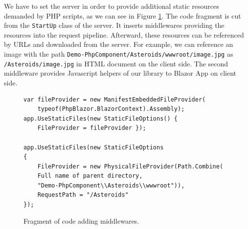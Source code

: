 We have to set the server in order to provide additional static resources demanded by PHP scripts, as we can see in Figure \ref{img19:settings}.
The code fragment is cut from the \texttt{StartUp} class of the server.
It inserts middlewares providing the resources into the request pipeline.
Afterward, these resources can be referenced by URLs and downloaded from the server.
For example, we can reference an image with the path \texttt{Demo-PhpComponent/Asteroids/wwwroot/image.jpg} as \texttt{/Asteroids/image.jpg} in HTML document on the client side.
The second middleware provides Javascript helpers of our library to Blazor App on client side.
\par
\begin{figure}[b]
\begin{lstlisting}
var fileProvider = new ManifestEmbeddedFileProvider(
	typeof(PhpBlazor.BlazorContext).Assembly);
app.UseStaticFiles(new StaticFileOptions() { 
	FileProvider = fileProvider });

app.UseStaticFiles(new StaticFileOptions
{
	FileProvider = new PhysicalFileProvider(Path.Combine(
	Full name of parent directory, 
	"Demo-PhpComponent\\Asteroids\\wwwroot")),
	RequestPath = "/Asteroids"
});
\end{lstlisting}
\caption{Fragment of code adding middlewares.}
\label{img19:settings}
\end{figure}
            
 